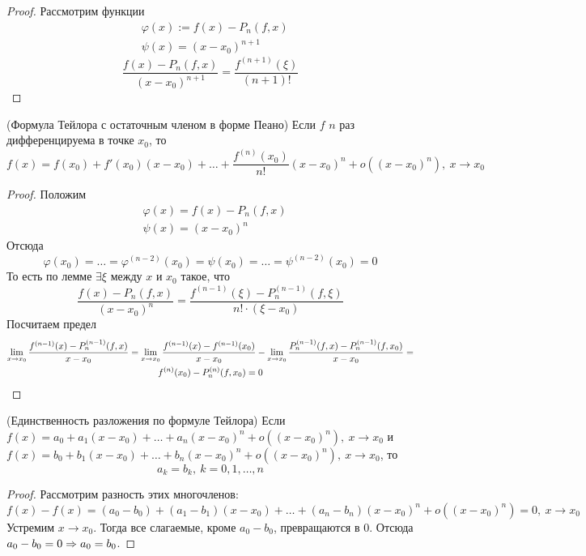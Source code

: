 \begin{proof}
	Рассмотрим функции
	\begin{align*}
		&\varphi(x) := f(x) - P_n(f, x)
		\\
		&\psi(x) = (x - x_0)^{n + 1}
	\end{align*}
	\[
		\frac{f(x) - P_n(f, x)}{(x - x_0)^{n + 1}} = \frac{f^{(n + 1)}(\xi)}{(n + 1)!}
	\]
\end{proof}

\begin{theorem} (Формула Тейлора с остаточным членом в форме Пеано)
	Если $f$ $n$ раз дифференцируема в точке $x_0$, то
	\[
		f(x) = f(x_0) + f'(x_0)(x - x_0) + \ldots + \frac{f^{(n)}(x_0)}{n!}(x - x_0)^n + o\left((x - x_0)^n\right),\ x \to x_0
	\]
\end{theorem}

\begin{proof}
	Положим
	\begin{align*}
		&\varphi(x) = f(x) - P_n(f, x)
		\\
		&\psi(x) = (x - x_0)^n
	\end{align*}
	Отсюда
	\[
		\varphi(x_0) = \ldots = \varphi^{(n - 2)}(x_0) = \psi(x_0) = \ldots = \psi^{(n - 2)}(x_0) = 0
	\]
	То есть по лемме $\exists \xi$ между $x$ и $x_0$ такое, что
	\[
		\frac{f(x) - P_n(f, x)}{(x - x_0)^n} = \frac{f^{(n - 1)}(\xi) - P_n^{(n - 1)}(f, \xi)}{n! \cdot (\xi - x_0)}
	\]
	Посчитаем предел
	\begin{multline*}
		\lim\limits_{x \to x_0} \frac{f^{(n - 1)}(x) - P_n^{(n - 1)}(f, x)}{x - x_0} = \lim\limits_{x \to x_0} \frac{f^{(n - 1)}(x) - f^{(n - 1)}(x_0)}{x - x_0} - \lim\limits_{x \to x_0} \frac{P_n^{(n - 1)}(f, x) - P_n^{(n - 1)}(f, x_0)}{x - x_0} = \\
		f^{(n)}(x_0) - P_n^{(n)}(f, x_0) = 0
	\end{multline*}
\end{proof}

\begin{theorem} (Единственность разложения по формуле Тейлора)
	Если $f(x) = a_0 + a_1(x - x_0) + \ldots + a_n(x - x_0)^n + o\left((x - x_0)^n\right),\ x \to x_0$ и $f(x) = b_0 + b_1(x - x_0) + \ldots + b_n(x - x_0)^n + o\left((x - x_0)^n\right),\ x \to x_0$, то
	\[
		a_k = b_k,\ k = 0, 1, \ldots, n
	\]
\end{theorem}

\begin{proof}
	Рассмотрим разность этих многочленов:
	\[
		f(x) - f(x) = (a_0 - b_0) + (a_1 - b_1)(x - x_0) + \ldots + (a_n - b_n)(x - x_0)^n + o\left((x - x_0)^n\right) = 0,\ x \to x_0
	\]
	Устремим $x \to x_0$. Тогда все слагаемые, кроме $a_0 - b_0$, превращаются в 0. Отсюда $a_0 - b_0 = 0 \Rightarrow a_0 = b_0$.
\end{proof}


